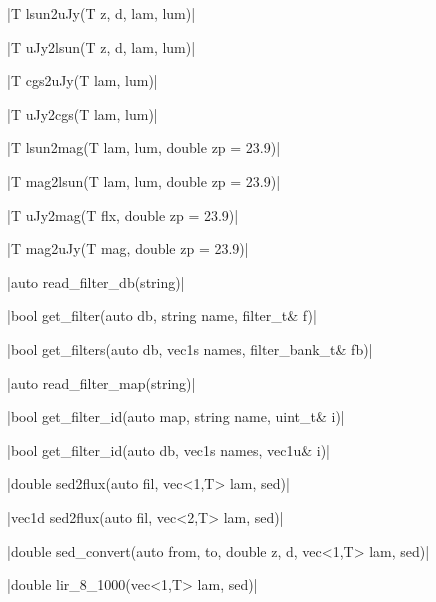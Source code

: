 \funcitem \cppinline|T lsun2uJy(T z, d, lam, lum)| 

\cppinline|T uJy2lsun(T z, d, lam, lum)| 

\funcitem \cppinline|T cgs2uJy(T lam, lum)| 

\cppinline|T uJy2cgs(T lam, lum)| 

\funcitem \cppinline|T lsun2mag(T lam, lum, double zp = 23.9)| 

\cppinline|T mag2lsun(T lam, lum, double zp = 23.9)| 

\funcitem \cppinline|T uJy2mag(T flx, double zp = 23.9)| 

\cppinline|T mag2uJy(T mag, double zp = 23.9)| 

\funcitem \cppinline|auto read_filter_db(string)| 

\funcitem \cppinline|bool get_filter(auto db, string name, filter_t& f)| 

\cppinline|bool get_filters(auto db, vec1s names, filter_bank_t& fb)| 

\funcitem \cppinline|auto read_filter_map(string)| 

\funcitem \cppinline|bool get_filter_id(auto map, string name, uint_t& i)| 

\cppinline|bool get_filter_id(auto db, vec1s names, vec1u& i)|

\funcitem \cppinline|double sed2flux(auto fil, vec<1,T> lam, sed)| 

\cppinline|vec1d sed2flux(auto fil, vec<2,T> lam, sed)|

\funcitem \cppinline|double sed_convert(auto from, to, double z, d, vec<1,T> lam, sed)| 

\funcitem \cppinline|double lir_8_1000(vec<1,T> lam, sed)| 
